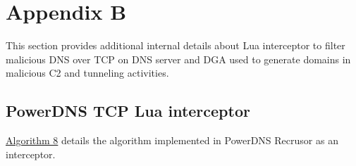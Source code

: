 \documentclass [11pt, proquest] {uwthesis}[2020/02/24]
\begin{document}

\section{Appendix B}
This section provides additional internal details about Lua interceptor to filter malicious DNS over TCP on DNS server and DGA used to generate domains in malicious C2 and tunneling activities.



\subsection{PowerDNS TCP Lua interceptor}
\hyperref[sec:alg8]{Algorithm 8} details the algorithm implemented in PowerDNS Recrusor as an interceptor.
\end{document}
